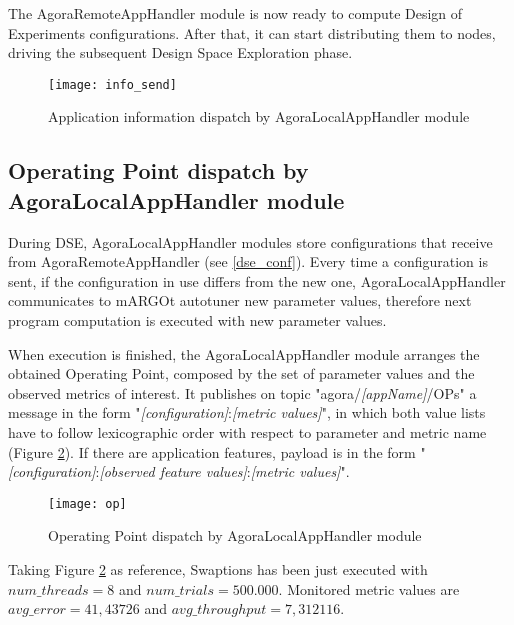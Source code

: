 The AgoraRemoteAppHandler module is now ready to compute Design of Experiments configurations. After that, it can start distributing them to nodes, driving the subsequent Design Space Exploration phase.

\begin{figure}[t]

    \centering
    \texttt{[image: info\_send]}
    \caption{Application information dispatch by AgoraLocalAppHandler module}
    \label{fig:info_send}
    
\end{figure}





\subsection{Operating Point dispatch by AgoraLocalAppHandler module}\label{opSend}

During DSE, AgoraLocalAppHandler modules store configurations that receive from AgoraRemoteAppHandler (see \ref{dse_conf}). Every time a configuration is sent, if the configuration in use differs from the new one, AgoraLocalAppHandler communicates to mARGOt autotuner new parameter values, therefore next program computation is executed with new parameter values.

When execution is finished, the AgoraLocalAppHandler module arranges the obtained Operating Point, composed by the set of parameter values and the observed metrics of interest. It publishes on topic "agora/\textit{[appName]}/OPs" a message in the form "\textit{[configuration]}:\textit{[metric values]}", in which both value lists have to follow lexicographic order with respect to parameter and metric name (Figure \ref{fig:op}). If there are application features, payload is in the form "\textit{[configuration]}:\textit{[ob\-served feature values]}:\textit{[metric values]}".

\begin{figure}[htb]

    \centering
    \texttt{[image: op]}
    \caption{Operating Point dispatch by AgoraLocalAppHandler module}
    \label{fig:op}
    
\end{figure}

Taking Figure \ref{fig:op} as reference, Swaptions has been just executed with\linebreak $num\_threads = 8$ and $num\_trials = 500.000$. Monitored metric values are $avg\_error = 41,43726$ and $avg\_throughput = 7,312116$.

